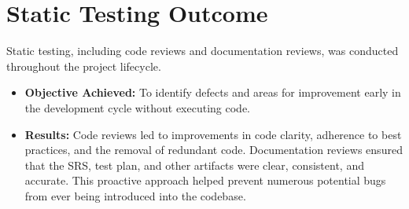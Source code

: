 \section{Static Testing Outcome}
\label{sec:static_testing_outcome}
Static testing, including code reviews and documentation reviews, was conducted throughout the project lifecycle.
\begin{itemize}
    \item \textbf{Objective Achieved:} To identify defects and areas for improvement early in the development cycle without executing code.
    \item \textbf{Results:} Code reviews led to improvements in code clarity, adherence to best practices, and the removal of redundant code. Documentation reviews ensured that the SRS, test plan, and other artifacts were clear, consistent, and accurate. This proactive approach helped prevent numerous potential bugs from ever being introduced into the codebase.
\end{itemize}
